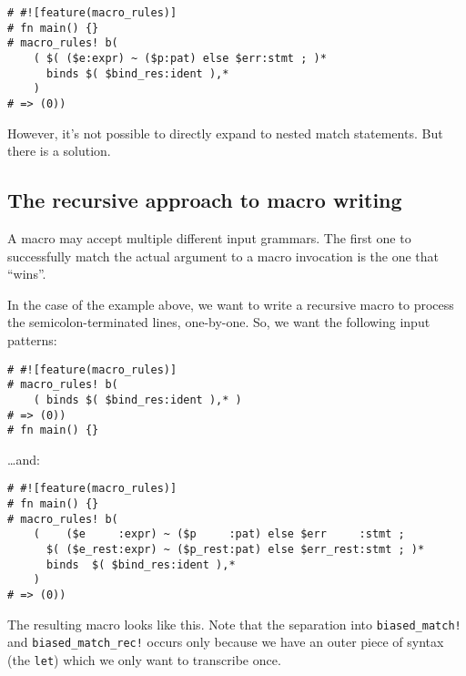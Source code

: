 \documentclass[]{article}
\begin{document}
\begin{verbatim}
# #![feature(macro_rules)]
# fn main() {}
# macro_rules! b(
    ( $( ($e:expr) ~ ($p:pat) else $err:stmt ; )*
      binds $( $bind_res:ident ),*
    )
# => (0))
\end{verbatim}

However, it's not possible to directly expand to nested match
statements. But there is a solution.

\subsection{The recursive approach to macro
writing}\label{the-recursive-approach-to-macro-writing}

A macro may accept multiple different input grammars. The first one to
successfully match the actual argument to a macro invocation is the one
that ``wins''.

In the case of the example above, we want to write a recursive macro to
process the semicolon-terminated lines, one-by-one. So, we want the
following input patterns:

\begin{verbatim}
# #![feature(macro_rules)]
# macro_rules! b(
    ( binds $( $bind_res:ident ),* )
# => (0))
# fn main() {}
\end{verbatim}

\ldots{}and:

\begin{verbatim}
# #![feature(macro_rules)]
# fn main() {}
# macro_rules! b(
    (    ($e     :expr) ~ ($p     :pat) else $err     :stmt ;
      $( ($e_rest:expr) ~ ($p_rest:pat) else $err_rest:stmt ; )*
      binds  $( $bind_res:ident ),*
    )
# => (0))
\end{verbatim}

The resulting macro looks like this. Note that the separation into
\texttt{biased\_match!} and \texttt{biased\_match\_rec!} occurs only
because we have an outer piece of syntax (the \texttt{let}) which we
only want to transcribe once.
\end{document}
